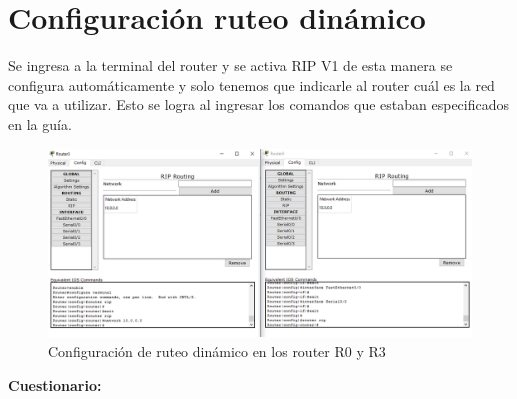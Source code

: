 \documentclass{udpreport}
\begin{document}
	\section{Configuración ruteo dinámico}
	Se ingresa a la terminal del router y se activa RIP V1 de esta manera se configura automáticamente y solo tenemos que
	indicarle al router cuál es la red que va a utilizar. Esto se logra al ingresar los comandos que estaban especificados en la
	guía.\\
	\begin{figure}[H]
	\centering
	\includegraphics[width=\textwidth]{Ruteo_dinamico.PNG}
	\caption{Configuración de ruteo dinámico en los router R0 y R3}
	\end{figure}
	\newpage
{\large \bf{Cuestionario: }}
\end{document}
